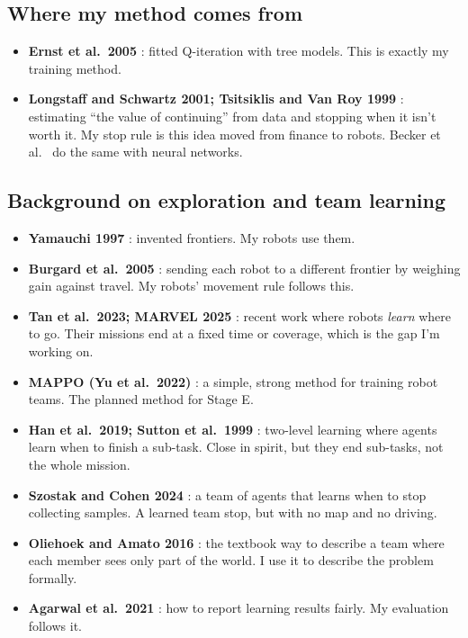 \documentclass[11pt,a4paper]{article}
\begin{document}
\subsection{Where my method comes from}
\begin{itemize}
  \item \textbf{Ernst et al.\ 2005} \cite{ernst2005}: fitted Q-iteration with tree models. This is exactly my training method.
  \item \textbf{Longstaff and Schwartz 2001; Tsitsiklis and Van Roy 1999} \cite{longstaff2001,tsitsiklis1999}: estimating ``the value of continuing'' from data and stopping when it isn't worth it. My stop rule is this idea moved from finance to robots. Becker et al.\ \cite{becker2019} do the same with neural networks.
\end{itemize}

\subsection{Background on exploration and team learning}
\begin{itemize}
  \item \textbf{Yamauchi 1997} \cite{yamauchi1997}: invented frontiers. My robots use them.
  \item \textbf{Burgard et al.\ 2005} \cite{burgard2005}: sending each robot to a different frontier by weighing gain against travel. My robots' movement rule follows this.
  \item \textbf{Tan et al.\ 2023; MARVEL 2025} \cite{tan2023,chiun2025marvel}: recent work where robots \emph{learn} where to go. Their missions end at a fixed time or coverage, which is the gap I'm working on.
  \item \textbf{MAPPO (Yu et al.\ 2022)} \cite{yu2022mappo}: a simple, strong method for training robot teams. The planned method for Stage E.
  \item \textbf{Han et al.\ 2019; Sutton et al.\ 1999} \cite{han2019,sutton1999}: two-level learning where agents learn when to finish a sub-task. Close in spirit, but they end sub-tasks, not the whole mission.
  \item \textbf{Szostak and Cohen 2024} \cite{szostak2024}: a team of agents that learns when to stop collecting samples. A learned team stop, but with no map and no driving.
  \item \textbf{Oliehoek and Amato 2016} \cite{oliehoek2016}: the textbook way to describe a team where each member sees only part of the world. I use it to describe the problem formally.
  \item \textbf{Agarwal et al.\ 2021} \cite{agarwal2021}: how to report learning results fairly. My evaluation follows it.
\end{itemize}
\end{document}
